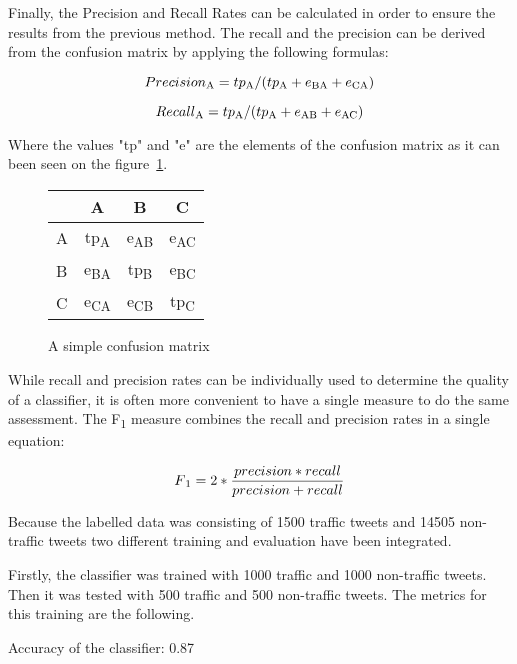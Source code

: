 Finally, the Precision and Recall Rates can be calculated in order to ensure the results from the previous method. The recall and the precision can be derived from the confusion matrix by applying the following formulas:

\[ Precision\textsubscript{A} = tp\textsubscript{A}/(tp\textsubscript{A}+e\textsubscript{BA}+e\textsubscript{CA}) \]

\[ Recall\textsubscript{A} = tp\textsubscript{A}/(tp\textsubscript{A}+e\textsubscript{AB}+e\textsubscript{AC}) \]

Where the values "tp" and "e" are the elements of the confusion matrix as it can been seen on the figure~\ref{fig:confisionMatixCalc}.

\begin{figure}[h]
\begin{center}
\begin{tabular}{| l || c | c | c | }
    \hline
        & A & B & C  \\ \hline \hline
        A & tp\textsubscript{A} & e\textsubscript{AB} & e\textsubscript{AC} \\ \hline
        B & e\textsubscript{BA }& tp\textsubscript{B} & e\textsubscript{BC} \\\hline
        C & e\textsubscript{CA} & e\textsubscript{CB} & tp\textsubscript{C} \\\hline
    \end{tabular}
	\caption{A simple confusion matrix}
    \label{fig:confisionMatixCalc}
\end{center}
\end{figure}

While recall and precision rates can be individually used to determine the quality of a classifier, it is often more convenient to have a single measure to do the same assessment. The F\textsubscript{1} measure combines the recall and precision rates in a single equation:

\[ F\textsubscript{1} = 2*\frac{precision*recall}{precision+recall} \]

Because the labelled data was consisting of 1500 traffic tweets and 14505 non-traffic tweets two different training and evaluation have been integrated. 

Firstly, the classifier was trained with 1000 traffic and 1000 non-traffic tweets. Then it was tested with 500 traffic and 500 non-traffic tweets. The metrics for this training are the following. 

Accuracy of the classifier:   0.87\\

